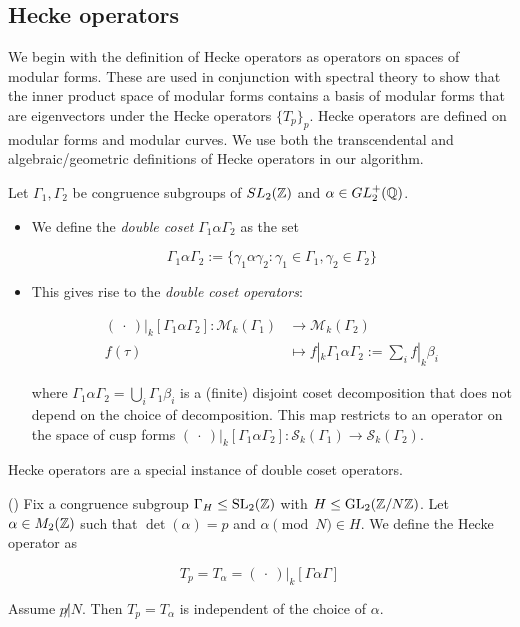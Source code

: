 \subsection{Hecke operators}

We begin with the definition of Hecke operators as operators on spaces of modular forms. These are used in conjunction with spectral theory to show that the inner product space of modular forms contains a basis of modular forms that are eigenvectors under the Hecke operators $\{T_p\}_p$. Hecke operators are defined on modular forms and modular curves. We use both the transcendental and algebraic/geometric definitions of Hecke operators in our algorithm.

\begin{defn}
Let $\Gamma_1, \Gamma_2$ be congruence subgroups of $SL_2(\mathbb{Z})$ and $\alpha \in GL_2^+(\mathbb{Q})$. 

\begin{itemize}
    \item We define the \textit{double coset} $\Gamma_1 \alpha \Gamma_2$ as the set 

\[
\Gamma_1 \alpha \Gamma_2 := \{\gamma_1 \alpha \gamma_2 : \gamma_1 \in \Gamma_1, \gamma_2 \in \Gamma_2\}
\]
\item This gives rise to the \textit{double coset operators}:

\begin{align} \label{eq:hecke_formula}
(\ \cdot \ )|_k [\Gamma_1 \alpha \Gamma_2] : \mathcal{M}_k(\Gamma_1) &\rightarrow \mathcal{M}_k(\Gamma_2) \\
f(\tau) &\mapsto f|_k \Gamma_1 \alpha \Gamma_2 := \sum_i f|_k \beta_i
\end{align}

where $\Gamma_1 \alpha \Gamma_2 = \bigcup_i \Gamma_1 \beta_i$ is a (finite) disjoint coset decomposition that does not depend on the choice of decomposition. This map restricts to an operator on the space of cusp forms $(\ \cdot \ )|_k [\Gamma_1 \alpha \Gamma_2] : \mathcal{S}_k(\Gamma_1) \rightarrow \mathcal{S}_k(\Gamma_2)$.
\end{itemize}
\end{defn}

Hecke operators are a special instance of double coset operators.

\begin{defn} (\cite{Assaf2020})
Fix a congruence subgroup $\Gamma_H \leq \operatorname{SL}_2(\mathbb{Z})$ with $H \leq \operatorname{GL}_2(\mathbb{Z}/N\mathbb{Z})$.
Let $\alpha \in M_2(\mathbb{Z})$ such that $\det (\alpha) = p$ and $\alpha \pmod{N} \in H$. We define the Hecke operator as

\[
T_p = T_\alpha = ( \ \cdot \ )|_k [\Gamma \alpha \Gamma]
\]

Assume $p \not | N$. Then $T_p = T_\alpha$ is independent of the choice of $\alpha$.
\end{defn}

